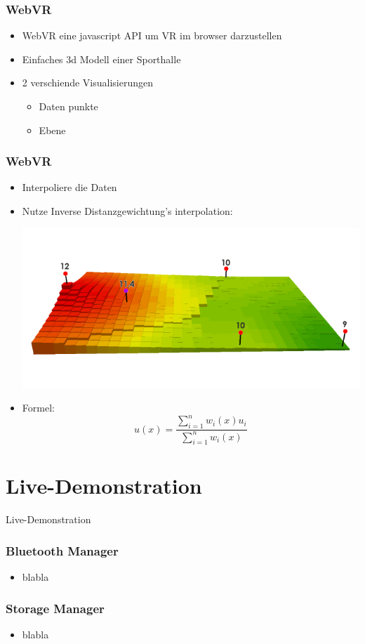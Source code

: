 \documentclass{beamer}
\begin{document}
\begin{frame}
\frametitle{WebVR}
\begin{itemize}
  \item WebVR eine javascript API um VR im browser darzustellen \pause
  \item Einfaches 3d Modell einer Sporthalle \pause
  \item 2 verschiende Visualisierungen
  \begin{itemize}
    \item Daten punkte
    \item Ebene
  \end{itemize}
\end{itemize}
\end{frame}

\begin{frame}
\frametitle{WebVR}
\begin{itemize}
  \item Interpoliere die Daten \pause
  \item Nutze Inverse Distanzgewichtung's interpolation:
  \begin{center}
  \includegraphics[scale=0.3]{IDW.png}
  \end{center}
  \pause
  \item Formel:
  $$
  u(x) = \frac{\sum_{i=1}^n w_i(x)u_i}{\sum_{i=1}^n w_i(x)}
  $$
\end{itemize}
\end{frame}


\section{Live-Demonstration}

\begin{frame}
\begin{center}
	Live-Demonstration
\end{center}
\end{frame}



\begin{frame}
\frametitle{Bluetooth Manager}
\begin{itemize}
  \item blabla
\end{itemize}
\end{frame}

\begin{frame}
\frametitle{Storage Manager}
\begin{itemize}
  \item blabla
\end{itemize}
\end{frame}
\end{document}
